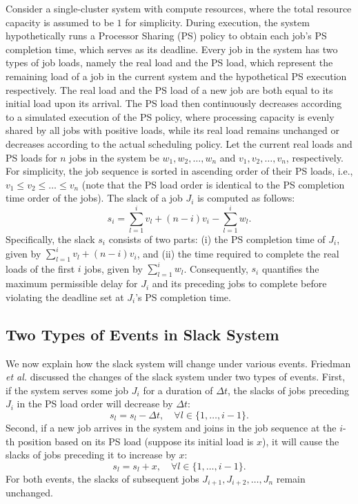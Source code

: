 Consider a single-cluster system with compute resources, where the total resource capacity is assumed to be $1$ for simplicity. During execution, the system hypothetically runs a Processor Sharing (PS) policy to obtain each job's PS completion time, which serves as its deadline. Every job in the system has two types of job loads, namely the real load and the PS load, which represent the remaining load of a job in the current system and the hypothetical PS execution respectively. The real load and the PS load of a new job are both equal to its initial load upon its arrival. The PS load then continuously decreases according to a simulated execution of the PS policy, where processing capacity is evenly shared by all jobs with positive loads, while its real load remains unchanged or decreases according to the actual scheduling policy. Let the current real loads and PS loads for $n$ jobs in the system be $w_1, w_2, \dots, w_n$ and $v_1, v_2, \dots, v_n$, respectively. For simplicity, the job sequence is sorted in ascending order of their PS loads, i.e., $v_1 \le v_2 \le \dots \le v_n$ (note that the PS load order is identical to the PS completion time order of the jobs). The slack of a job $J_i$ is computed as follows:
\begin{equation}
    \label{eq:slack_single}
    s_i = \sum_{l=1}^{i} v_{l} + (n-i)v_i- \sum_{l=1}^i w_l.
\end{equation}
Specifically, the slack $s_i$ consists of two parts: (i) the PS completion time of $J_i$, given by $\sum_{l=1}^{i} v_{l} + (n-i)v_i$, and (ii) the time required to complete the real loads of the first $i$ jobs, given by $\sum_{l=1}^i w_l$. Consequently, $s_i$ quantifies the maximum permissible delay for $J_i$ and its preceding jobs to complete before violating the deadline set at $J_i$'s PS completion time.

\subsection{Two Types of Events in Slack System}
\label{sec:Pre_TwoEvents}
We now explain how the slack system will change under various events. Friedman \textit{et al.} \cite{friedman2003protective} discussed the changes of the slack system under two types of events. First, if the system serves some job $J_i$ for a duration of $\Delta t$, the slacks of jobs preceding $J_i$ in the PS load order will decrease by $\Delta t$:
\begin{equation}
    s_l = s_l -\Delta t,\quad \forall l \in \{1, \dots, i-1\}.
\end{equation}
Second, if a new job arrives in the system and joins in the job sequence at the $i$-th position based on its PS load (suppose its initial load is $x$), it will cause the slacks of jobs preceding it to increase by $x$:
\begin{equation}
    s_l = s_l + x,\quad \forall l \in \{1, \dots, i-1\}.
\end{equation}
For both events, the slacks of subsequent jobs $J_{i+1}, J_{i+2}, \dots, J_n$ remain unchanged. 

